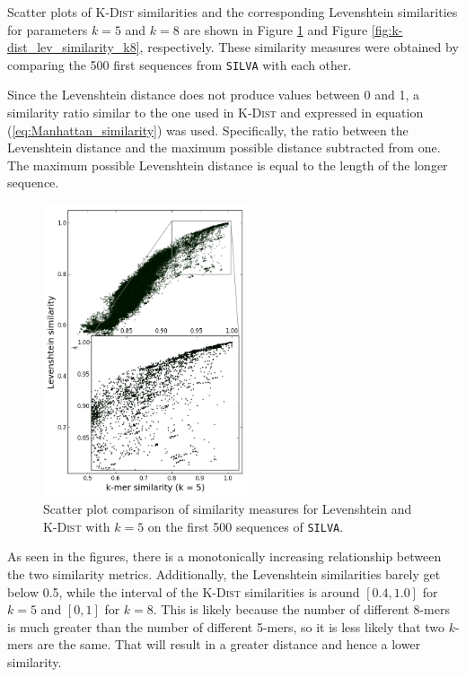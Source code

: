 Scatter plots of \textsc{K-Dist} similarities and the corresponding Levenshtein
similarities for parameters $k=5$ and $k=8$ are shown in Figure
\ref{fig:k-dist_lev_similarity_k5} and Figure
\ref{fig:k-dist_lev_similarity_k8}, respectively. These similarity measures
were obtained by comparing the 500 first sequences from \texttt{SILVA} with
each other.

Since the Levenshtein distance does not produce values between 0 and 1, a
similarity ratio similar to the one used in \textsc{K-Dist} and expressed in
equation (\ref{eq:Manhattan_similarity}) was used. Specifically, the ratio
between the Levenshtein distance and the maximum possible distance subtracted
from one. The maximum possible Levenshtein distance is equal to the length of
the longer sequence.

\begin{figure}
  \includegraphics[width=0.54\textwidth]{graphics/Levenshtein_K-Dist_k5.png}
  \caption{Scatter plot comparison of similarity measures for Levenshtein and
    \textsc{K-Dist} with $k=5$ on the first 500 sequences of \texttt{SILVA}.}
  \label{fig:k-dist_lev_similarity_k5}
\end{figure}

As seen in the figures, there is a monotonically increasing relationship
between the two similarity metrics. Additionally, the Levenshtein similarities
barely get below 0.5, while the interval of the \textsc{K-Dist} similarities is
around $[0.4,1.0]$ for $k=5$ and $[0,1]$ for $k=8$. This is likely because the
number of different 8-mers is much greater than the number of different 5-mers,
so it is less likely that two $k$-mers are the same. That will result in a
greater distance and hence a lower similarity.


